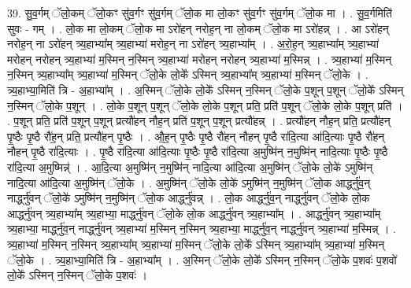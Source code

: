 \documentclass[17pt]{extarticle}
\begin{document}
39. सु॒व॒र्गम् ॅलो॒कम् ॅलो॒कꣳ सु॑व॒र्गꣳ सु॑व॒र्गम् ॅलो॒क मा लो॒कꣳ सु॑व॒र्गꣳ सु॑व॒र्गम् ॅलो॒क मा । . सु॒व॒र्गमिति॑ सुवः - गम् । . लो॒क मा लो॒कम् ॅलो॒क मा ऽरो॑हन् नरोह॒न् ना लो॒कम् ॅलो॒क मा ऽरो॑हन्न् । . आ ऽरो॑हन् नरोह॒न् ना ऽरो॑हन् त्र्य॒हाभ्या᳚म् त्र्य॒हाभ्या॑ मरोह॒न् ना ऽरो॑हन् त्र्य॒हाभ्या᳚म् । . अ॒रो॒ह॒न् त्र्य॒हाभ्या᳚म् त्र्य॒हाभ्या॑ मरोहन् नरोहन् त्र्य॒हाभ्या॑ म॒स्मिन् न॒स्मिन् त्र्य॒हाभ्या॑ मरोहन् नरोहन् त्र्य॒हाभ्या॑ म॒स्मिन्न् । . त्र्य॒हाभ्या॑ म॒स्मिन् न॒स्मिन् त्र्य॒हाभ्या᳚म् त्र्य॒हाभ्या॑ म॒स्मिन् ॅलो॒के लो॒के᳚ ऽस्मिन् त्र्य॒हाभ्या᳚म् त्र्य॒हाभ्या॑ म॒स्मिन् ॅलो॒के । . त्र्य॒हाभ्या॒मिति॑ त्रि - अ॒हाभ्या᳚म् । . अ॒स्मिन् ॅलो॒के लो॒के᳚ ऽस्मिन् न॒स्मिन् ॅलो॒के प॒शून् प॒शून् ॅलो॒के᳚ ऽस्मिन् न॒स्मिन् ॅलो॒के प॒शून् । . लो॒के प॒शून् प॒शून् ॅलो॒के लो॒के प॒शून् प्रति॒ प्रति॑ प॒शून् ॅलो॒के लो॒के प॒शून् प्रति॑ । . प॒शून् प्रति॒ प्रति॑ प॒शून् प॒शून् प्रत्यौ॑हन् नौह॒न् प्रति॑ प॒शून् प॒शून् प्रत्यौ॑हन्न् । . प्रत्यौ॑हन् नौह॒न् प्रति॒ प्रत्यौ॑हन् पृ॒ष्ठैः पृ॒ष्ठै रौ॑ह॒न् प्रति॒ प्रत्यौ॑हन् पृ॒ष्ठैः । . औ॒ह॒न् पृ॒ष्ठैः पृ॒ष्ठै रौ॑हन् नौहन् पृ॒ष्ठै रा॑दि॒त्या आ॑दि॒त्याः पृ॒ष्ठै रौ॑हन् नौहन् पृ॒ष्ठै रा॑दि॒त्याः । . पृ॒ष्ठै रा॑दि॒त्या आ॑दि॒त्याः पृ॒ष्ठैः पृ॒ष्ठै रा॑दि॒त्या अ॒मुष्मि॑न् न॒मुष्मि॑न् नादि॒त्याः पृ॒ष्ठैः पृ॒ष्ठै रा॑दि॒त्या अ॒मुष्मिन्न्॑ । . आ॒दि॒त्या अ॒मुष्मि॑न् न॒मुष्मि॑न् नादि॒त्या आ॑दि॒त्या अ॒मुष्मि॑न् ॅलो॒के लो॒के॑ ऽमुष्मि॑न् नादि॒त्या आ॑दि॒त्या अ॒मुष्मि॑न् ॅलो॒के । . अ॒मुष्मि॑न् ॅलो॒के लो॒के॑ ऽमुष्मि॑न् न॒मुष्मि॑न् ॅलो॒क आर्द्ध्नु॑व॒न् नार्द्ध्नु॑वन् ॅलो॒के॑ ऽमुष्मि॑न् न॒मुष्मि॑न् ॅलो॒क आर्द्ध्नु॑वन्न् । . लो॒क आर्द्ध्नु॑व॒न् नार्द्ध्नु॑वन् ॅलो॒के लो॒क आर्द्ध्नु॑वन् त्र्य॒हाभ्या᳚म् त्र्य॒हाभ्या॒ मार्द्ध्नु॑वन् ॅलो॒के लो॒क आर्द्ध्नु॑वन् त्र्य॒हाभ्या᳚म् । . आर्द्ध्नु॑वन् त्र्य॒हाभ्या᳚म् त्र्य॒हाभ्या॒ मार्द्ध्नु॑व॒न् नार्द्ध्नु॑वन् त्र्य॒हाभ्या॑ म॒स्मिन् न॒स्मिन् त्र्य॒हाभ्या॒ मार्द्ध्नु॑व॒न् नार्द्ध्नु॑वन् त्र्य॒हाभ्या॑ म॒स्मिन्न् । . त्र्य॒हाभ्या॑ म॒स्मिन् न॒स्मिन् त्र्य॒हाभ्या᳚म् त्र्य॒हाभ्या॑ म॒स्मिन् ॅलो॒के लो॒के᳚ ऽस्मिन् त्र्य॒हाभ्या᳚म् त्र्य॒हाभ्या॑ म॒स्मिन् ॅलो॒के । . त्र्य॒हाभ्या॒मिति॑ त्रि - अ॒हाभ्या᳚म् । . अ॒स्मिन् ॅलो॒के लो॒के᳚ ऽस्मिन् न॒स्मिन् ॅलो॒के प॒शवः॑ प॒शवो॑ लो॒के᳚ ऽस्मिन् न॒स्मिन् ॅलो॒के प॒शवः॑ । \newline
\pagebreak
{}
\end{document}
